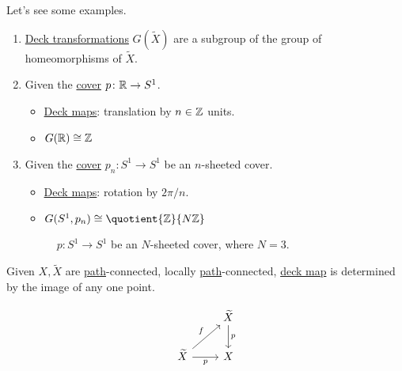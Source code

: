 \begin{eg}
	Let's see some examples.
	\begin{enumerate}
		\item \hyperref[def:deck-transformation]{Deck transformations} \(G(\widetilde{X} )\) are a subgroup of the group of homeomorphisms of \(\widetilde{X} \).
		\item Given the \hyperref[def:covering-map]{cover} \(p\colon \mathbb{\MakeUppercase{r}} \to S^1\).
		      \begin{itemize}
			      \item \hyperref[def:deck-transformation]{Deck maps}: translation by \(n\in \mathbb{\MakeUppercase{z}} \) units.
			      \item \(G(\mathbb{\MakeUppercase{r}} )\cong \mathbb{\MakeUppercase{z}} \)
		      \end{itemize}
		\item Given the \hyperref[def:covering-map]{cover} \(p_{n}\colon S^{1}\to S^1\) be an \(n\)-sheeted cover.
		      \begin{itemize}
			      \item \hyperref[def:deck-transformation]{Deck maps}: rotation by \(2\pi / n\).
			      \item \(G(S^1, p_{n})\cong \quotient{\mathbb{\MakeUppercase{z}} }{N \mathbb{\MakeUppercase{z}} } \)
		      \end{itemize}
		      \begin{figure}[H]
			      \centering
			      \caption{\(p\colon S^1 \to S^1\) be an \(N\)-sheeted cover, where \(N = 3\).}
			      \label{fig:eg:lec17:N-sheeted-cover}
		      \end{figure}
	\end{enumerate}
\end{eg}

\begin{exercise}\label{ex:lec17}
	Given \(X, \widetilde{X} \) are \hyperref[def:path]{path}-connected, locally \hyperref[def:path]{path}-connected,
	\hyperref[def:deck-transformation]{deck map} is determined by the image of any one point.
\end{exercise}
\begin{answer}
	\[\begin{tikzcd}
			& {\widetilde{X}} \\
			{\widetilde{X}} & X
			\arrow["f", from=2-1, to=1-2]
			\arrow["p"', from=2-1, to=2-2]
			\arrow["p", from=1-2, to=2-2]
		\end{tikzcd}\]
\end{answer}

